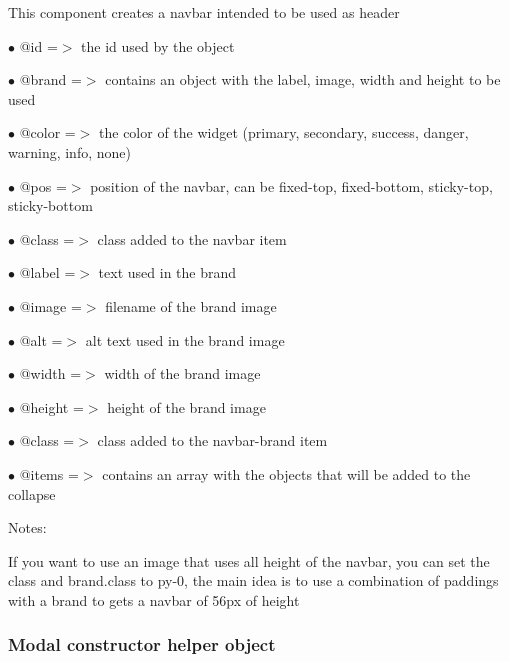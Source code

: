 \documentclass[a4paper]{article}
\begin{document}
This component creates a navbar intended to be used as header

\begin{compactitem}
\item[\color{myblue}$\bullet$] @id    =$>$ the id used by the object
\item[\color{myblue}$\bullet$] @brand =$>$ contains an object with the label, image, width and height to be used
\item[\color{myblue}$\bullet$] @color =$>$ the color of the widget (primary, secondary, success, danger, warning, info, none)
\item[\color{myblue}$\bullet$] @pos   =$>$ position of the navbar, can be fixed-top, fixed-bottom, sticky-top, sticky-bottom
\item[\color{myblue}$\bullet$] @class =$>$ class added to the navbar item
\end{compactitem}

\begin{compactitem}
\item[\color{myblue}$\bullet$] @label  =$>$ text used in the brand
\item[\color{myblue}$\bullet$] @image  =$>$ filename of the brand image
\item[\color{myblue}$\bullet$] @alt    =$>$ alt text used in the brand image
\item[\color{myblue}$\bullet$] @width  =$>$ width of the brand image
\item[\color{myblue}$\bullet$] @height =$>$ height of the brand image
\item[\color{myblue}$\bullet$] @class  =$>$ class added to the navbar-brand item
\end{compactitem}

\begin{compactitem}
\item[\color{myblue}$\bullet$] @items =$>$ contains an array with the objects that will be added to the collapse
\end{compactitem}

Notes:

If you want to use an image that uses all height of the navbar, you can set the class and
brand.class to py-0, the main idea is to use a combination of paddings with a brand to
gets a navbar of 56px of height

\hypertarget{toc104}{}
\subsubsection{Modal constructor helper object}
\end{document}
